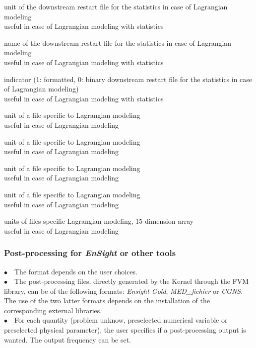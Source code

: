 {unit of the downstream restart file for the statistics in case of
Lagrangian modeling\\
useful in case of Lagrangian modeling with statistics}

{name of the downstream restart file for the statistics in case of
Lagrangian modeling\\
useful in case of Lagrangian modeling with statistics}

{indicator (1: formatted, 0: binary downstream restart file for the
statistics in case of Lagrangian modeling)\\
useful in case of Lagrangian modeling with statistics}

{unit of a file specific to Lagrangian modeling\\
useful in case of Lagrangian modeling}

{unit of a file specific to Lagrangian modeling\\
useful in case of Lagrangian modeling}

{unit of a file specific to Lagrangian modeling\\
useful in case of Lagrangian modeling}

{unit of a file specific to Lagrangian modeling\\
useful in case of Lagrangian modeling}

{units of files specific Lagrangian modeling, 15-dimension array\\
useful in case of Lagrangian modeling}


\subsubsection{Post-processing for {\em EnSight} or other tools}

$\bullet\quad$The format depends on the user choices.\\
$\bullet\quad$The post-processing files, directly generated by the Kernel
through the FVM library, can be of the following formats: {\em Ensight Gold},
{\em MED\_fichier} or {\em CGNS}. The use of the two latter formats depends on
the installation of the corresponding external libraries.\\
$\bullet\quad$For each quantity (problem unknow, preselected numerical
variable or preselected physical parameter), the user specifies if a
post-processing output is wanted. The output frequency can be set.\\


